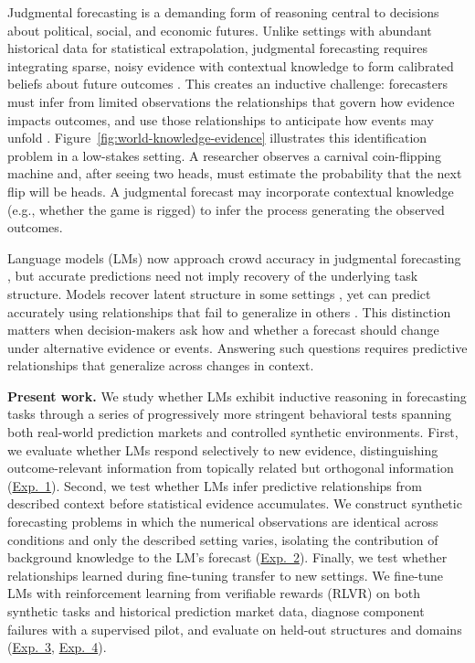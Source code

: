 Judgmental forecasting is a demanding form of reasoning central to decisions
about political, social, and economic futures. Unlike settings with abundant
historical data for statistical extrapolation, judgmental forecasting requires
integrating sparse, noisy evidence with contextual knowledge to form calibrated
beliefs about future outcomes
\citep{tetlock2016superforecasting,mellers2014psychological,lawrence2006judgmental}.
This creates an inductive challenge: forecasters must
infer from limited observations the relationships that govern how evidence
impacts outcomes, and use those relationships to anticipate how events may
unfold
\citep{tenenbaum2006theory,griffiths2010probabilistic,tenenbaum2011mind,lake2017building}.
Figure~\ref{fig:world-knowledge-evidence} illustrates this identification problem
in a low-stakes setting. A researcher observes a carnival coin-flipping machine
and, after seeing two heads, must estimate the probability that the next flip
will be heads. A judgmental forecast may incorporate contextual knowledge (e.g.,
whether the game is rigged) to infer the process generating the observed
outcomes.

Language models (LMs) now approach crowd accuracy in judgmental forecasting
\citep{halawi2024approaching,schoenegger2024wisdom}, but accurate predictions need
not imply recovery of the underlying task structure. Models recover latent
structure in some settings \citep{li2023emergent}, yet can predict accurately
using relationships that fail to generalize in others \citep{vafa2025foundation}.
This distinction matters when decision-makers ask how and whether a forecast
should change under alternative evidence or events. Answering such questions
requires predictive relationships that generalize across changes in context.

\noindent
\textbf{Present work.}
We study whether LMs exhibit inductive reasoning in forecasting tasks through a
series of progressively more stringent behavioral tests spanning both real-world
prediction markets and controlled synthetic environments. First, we evaluate
whether LMs respond selectively to new evidence, distinguishing
outcome-relevant information from topically related but orthogonal information
(\hyperref[sec:exp1]{Exp.~1}). Second, we test whether LMs infer predictive
relationships from described context before statistical evidence accumulates. We
construct synthetic forecasting problems in which the numerical observations are
identical across conditions and only the described setting varies, isolating the
contribution of background knowledge to the LM's forecast
(\hyperref[sec:exp2]{Exp.~2}). Finally, we test whether relationships learned
during fine-tuning transfer to new settings. We fine-tune LMs with reinforcement
learning from verifiable rewards (RLVR) on both synthetic tasks and historical
prediction market data, diagnose component failures with a supervised pilot,
and evaluate on held-out structures and domains
(\hyperref[sec:exp3]{Exp.~3}, \hyperref[sec:exp4]{Exp.~4}).

